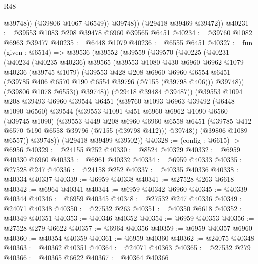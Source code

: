 \begin{lexlean}{R48}
\begin{coremodule}
                @39748))
            (@39806 @1067 @6549))
          @39748))
      (@29418 @39469 @39472))
@40231 := @39553 @1083 @208 @39478 @6960 @39565 @6451
@40234 := @39760 @1082 @6963 @39477
@40235 := @6448 @1079
@40236 := @6555 @6451
@40327 := fun (given : @6514) =>
  @39536
    (@39552
      (@39559
        (@39570
          (@40225
            (@40231
              (@40234
                (@40235 @40236)
                @39565
                (@39553
                  @1080
                  @430
                  @6960
                  @6962
                  @1079
                  @40236
                  (@39745 @1079)
                  (@39553
                    @428
                    @208
                    @6960
                    @6960
                    @6554
                    @6451
                    (@39785 @406 @6570 @190 @6554 @39796 (@7155 (@39798 @406)))
                    @39748))
                (@39806 @1078 @6553))
              @39748))
          (@29418 @39484 @39487))
        (@39553
          @1094
          @208
          @39493
          @6960
          @39544
          @6451
          (@39760
            @1093
            @6963
            @39492
            (@6448 @1090 @6560)
            @39544
            (@39553
              @1091
              @451
              @6960
              @6962
              @1090
              @6560
              (@39745 @1090)
              (@39553
                @449
                @208
                @6960
                @6960
                @6558
                @6451
                (@39785 @412 @6570 @190 @6558 @39796 (@7155 (@39798 @412)))
                @39748))
            (@39806 @1089 @6557))
          @39748))
      (@29418 @39499 @39502))
@40328 := (config : @6615) -> @6956
@40329 := @24155 @252
@40330 := @8524 @40329
@40332 := @6959 @40330 @6960
@40333 := @6961 @40332
@40334 := @6959 @40333
@40335 := @27528 @247
@40336 := @24158 @252
@40337 := @40335 @40336
@40338 := @40334 @40337
@40339 := @6959 @40338
@40341 := @27528 @263 @6618
@40342 := @6964 @40341
@40344 := @6959 @40342 @6960
@40345 := @40339 @40344
@40346 := @6959 @40345
@40348 := @27532 @247 @40336
@40349 := @24071 @40348
@40350 := @27532 @263
@40351 := @40350 @6618
@40352 := @40349 @40351
@40353 := @40346 @40352
@40354 := @6959 @40353
@40356 := @27528 @279 @6622
@40357 := @6964 @40356
@40359 := @6959 @40357 @6960
@40360 := @40354 @40359
@40361 := @6959 @40360
@40362 := @24075 @40348
@40363 := @40362 @40351
@40364 := @24071 @40363
@40365 := @27532 @279
@40366 := @40365 @6622
@40367 := @40364 @40366

\end{coremodule}
\end{lexlean}
